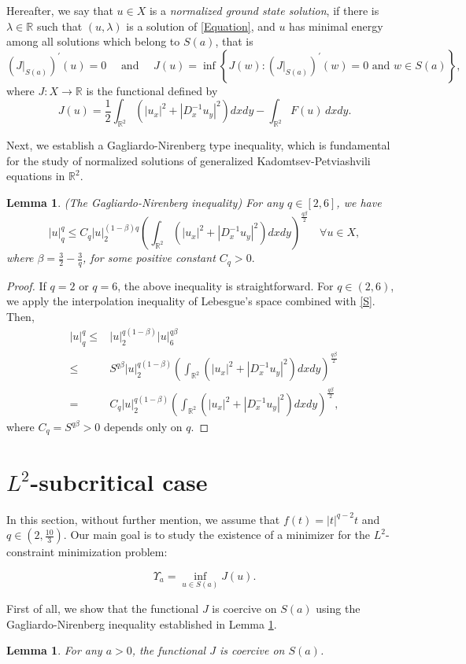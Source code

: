 \documentclass[11pt]{amsart}
\newtheorem{lemma}[theorem]{Lemma}
\numberwithin{equation}{section}
\newcommand\R{\mathbb R}
\begin{document}
{{{$$$$
Hereafter,  we say that $u \in X$ is a {\it normalized ground state solution}, if there is $\lambda \in \mathbb{R}$ such that $(u,\lambda)$ is a solution of \eqref{Equation}, and $u$ has minimal energy among all solutions which belong to $S(a)$, that is
$$
\left(\left.J\right|_{S(a)}\right)^{\prime}(u)=0 \quad \text { and } \quad J(u)=\inf \left\{J(w):\left(\left.J\right|_{S(a)}\right)^{\prime}(w)=0 \text { and } w \in S(a)\right\},
$$
{where $J: X \rightarrow \R$ is the functional defined by
\begin{equation*}
    J(u)=\frac{1}{2}\int_{\mathbb{R}^{2}} \left(|u_{x}|^{2} + |D^{-1}_{x} u_{y}|^{2} \right)dx dy-\int_{\mathbb{R}^2} F(u) \,dxdy.
\end{equation*}}



{Next, we establish a Gagliardo-Nirenberg type inequality, which is fundamental for the study of normalized solutions of generalized Kadomtsev-Petviashvili equations in $\mathbb{R}^2$.}
\begin{lemma} \label{L1}(The Gagliardo-Nirenberg inequality)
    For any $q\in [2, 6]$, we have
{   \begin{equation}\label{Gagliardo}
        |u|^{q}_{q} \leq C_q|u|^{(1-\beta )q}_{2}\left(\int_{\mathbb{R}^2}\left(\left|u_x\right|^2+\left|D_x^{-1} u_y\right|^2\right) d xdy\right)^{\frac{q\beta}{2}} \quad \forall u \in X,
    \end{equation}}
where  $ \beta=\frac{3}{2}-\frac{3}{q}$, for some positive constant $C_q>0.$
\end{lemma}
\begin{proof}
    If $q=2$ or $q=6$, the above inequality is straightforward. For $q\in (2, 6)$, we apply the interpolation inequality of Lebesgue's space combined with \eqref{S}. Then,
    \begin{align*}
        |u|^{q}_q \leq & |u|^{q(1-\beta)}_2|u|^{q\beta}_6 \\
        \leq  & S^{q\beta}|u|^{q(1-\beta)}_2\left(\int_{\mathbb{R}^2}\left(\left|u_x\right|^2+\left|D_x^{-1} u_y\right|^2\right) d xdy\right)^{\frac{q\beta}{2}}\\
        =  & C_q|u|^{q(1-\beta)}_2\left(\int_{\mathbb{R}^2}\left(\left|u_x\right|^2+\left|D_x^{-1} u_y\right|^2\right) d xdy\right)^{\frac{q\beta}{2}},
    \end{align*}
    where $C_q=S^{q\beta}>0$  depends only on $q$.
\end{proof}
\section{{$L^2$-subcritical case}}
In this section, without further mention, we assume that {$f(t)=|t|^{q-2}t$} and $q \in (2,\frac{10}{3})$. {Our main goal is to study} the existence of a minimizer for the $L^{2}$-constraint minimization problem:}
$$
\Upsilon_a=\inf_{u \in S(a)}J(u).
$$
{First of all, we show that the functional $J$ is coercive on $S(a)$ using the Gagliardo-Nirenberg inequality established in Lemma \ref{L1}.
\begin{lemma}\label{L2}
For any $a>0$, the functional $J$ is coercive on $S(a)$.
\end{lemma}

}}}
\end{document}

